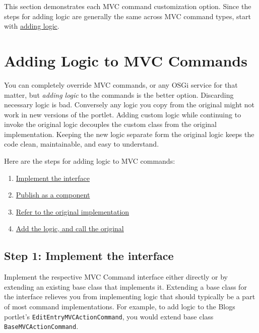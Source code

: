 This section demonstrates each MVC command customization option. Since
the steps for adding logic are generally the same across MVC command
types, start with
\href{/docs/7-2/customization/-/knowledge_base/c/adding-logic-to-mvc-commands}{adding
logic}.

\chapter{Adding Logic to MVC
Commands}\label{adding-logic-to-mvc-commands}

You can completely override MVC commands, or any OSGi service for that
matter, but \emph{adding logic} to the commands is the better option.
Discarding necessary logic is bad. Conversely any logic you copy from
the original might not work in new versions of the portlet. Adding
custom logic while continuing to invoke the original logic decouples the
custom class from the original implementation. Keeping the new logic
separate form the original logic keeps the code clean, maintainable, and
easy to understand.

Here are the steps for adding logic to MVC commands:

\begin{enumerate}
\def\labelenumi{\arabic{enumi}.}
\tightlist
\item
  \hyperref[step-1-implement-the-interface]{Implement the interface}
\item
  \hyperref[step-2-publish-as-a-component]{Publish as a component}
\item
  \hyperref[step-3-refer-to-the-original-implementation]{Refer to the
  original implementation}
\item
  \hyperref[step-4-add-the-logic]{Add the logic, and call the original}
\end{enumerate}

\section{Step 1: Implement the
interface}\label{step-1-implement-the-interface}

Implement the respective MVC Command interface either directly or by
extending an existing base class that implements it. Extending a base
class for the interface relieves you from implementing logic that should
typically be a part of most command implementations. For example, to add
logic to the Blogs portlet's \texttt{EditEntryMVCActionCommand}, you
would extend base class \texttt{BaseMVCActionCommand}.

